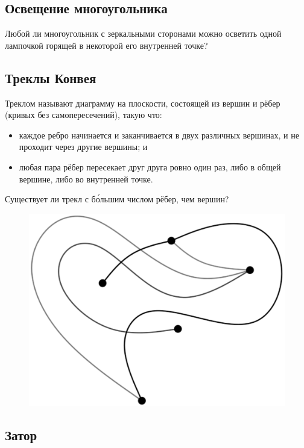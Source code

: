\subsection*{Освещение многоугольника}

Любой ли многоугольник с зеркальными сторонами можно осветить одной лампочкой горящей в некоторой его внутренней точке?

\subsection*{Треклы Конвея}

Треклом называют диаграмму на плоскости, состоящей из вершин и рёбер (кривых без самопересечений), такую что:
\begin{itemize}
\item каждое ребро начинается и заканчивается в двух различных вершинах, и не проходит через другие вершины; и
\item любая пара рёбер пересекает друг друга ровно один раз, либо в общей вершине, либо во внутренней точке.
\end{itemize}

Существует ли трекл с б\'{о}льшим числом рёбер, чем вершин?

\begin{figure}[h!]
\centering
\includegraphics[scale=0.5]{Figs/UnsolvedPuzzles/thrack}
\end{figure}

\subsection*{Затор}

